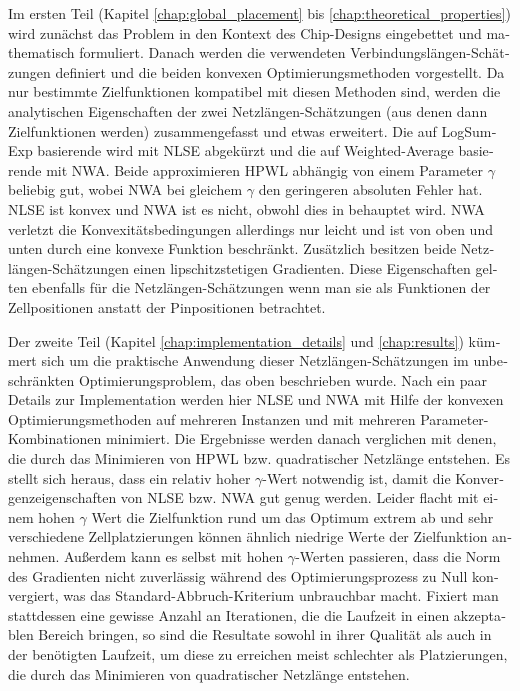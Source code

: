 \begin{otherlanguage}{ngerman}
Im ersten Teil (Kapitel \ref{chap:global_placement} bis \ref{chap:theoretical_properties})
wird zun\"achst das Problem in den Kontext des Chip-Designs eingebettet und mathematisch formuliert.
Danach werden die verwendeten Verbindungsl\"angen-Sch\"atzungen definiert
und die beiden konvexen Optimierungsmethoden vorgestellt.
Da nur bestimmte Zielfunktionen kompatibel mit diesen Methoden sind,
werden die analytischen Eigenschaften der zwei Netzl\"angen-Sch\"atzungen (aus denen dann Zielfunktionen werden)
zusammengefasst und etwas erweitert.
Die auf LogSumExp basierende wird mit NLSE abgek\"urzt und die auf Weighted-Average basierende mit NWA.
Beide approximieren HPWL abh\"angig von einem Parameter \(\gamma\) beliebig gut,
wobei NWA bei gleichem \(\gamma\) den geringeren absoluten Fehler hat.
NLSE ist konvex und NWA ist es nicht, obwohl dies in \cite{HsuChangBalabanov-AnalyticalPlacementFor3dIcDesigns} behauptet wird.
NWA verletzt die Konvexit\"atsbedingungen allerdings nur leicht und ist von oben und unten durch eine konvexe Funktion beschr\"ankt.
Zus\"atzlich besitzen beide Netzl\"angen-Sch\"atzungen einen lipschitzstetigen Gradienten.
Diese Eigenschaften gelten ebenfalls f\"ur die Netzl\"angen-Sch\"atzungen wenn man sie als Funktionen der Zellpositionen
anstatt der Pinpositionen betrachtet.

Der zweite Teil (Kapitel \ref{chap:implementation_details} und \ref{chap:results})
k\"ummert sich um die praktische Anwendung dieser Netzl\"angen-Sch\"atzungen im unbeschr\"ankten Optimierungsproblem,
das oben beschrieben wurde.
Nach ein paar Details zur Implementation werden hier NLSE und NWA
mit Hilfe der konvexen Optimierungsmethoden auf mehreren Instanzen
und mit mehreren Parameter-Kombinationen minimiert.
Die Ergebnisse werden danach verglichen mit denen,
die durch das Minimieren von HPWL bzw. quadratischer Netzl\"ange entstehen.
Es stellt sich heraus, dass ein relativ hoher \(\gamma\)-Wert notwendig ist,
damit die Konvergenzeigenschaften von NLSE bzw. NWA gut genug werden.
Leider flacht mit einem hohen \(\gamma\) Wert die Zielfunktion
rund um das Optimum extrem ab und sehr verschiedene Zellplatzierungen
k\"onnen \"ahnlich niedrige Werte der Zielfunktion annehmen.
Au\ss{}erdem kann es selbst mit hohen \(\gamma\)-Werten passieren,
dass die Norm des Gradienten nicht zuverl\"assig w\"ahrend des Optimierungsprozess
zu Null konvergiert, was das Standard-Abbruch-Kriterium unbrauchbar macht.
Fixiert man stattdessen eine gewisse Anzahl an Iterationen, die die Laufzeit in einen akzeptablen Bereich bringen,
so sind die Resultate sowohl in ihrer Qualit\"at als auch in der ben\"otigten Laufzeit,
um diese zu erreichen meist schlechter als Platzierungen, die durch das Minimieren von quadratischer Netzl\"ange entstehen.

\end{otherlanguage}
